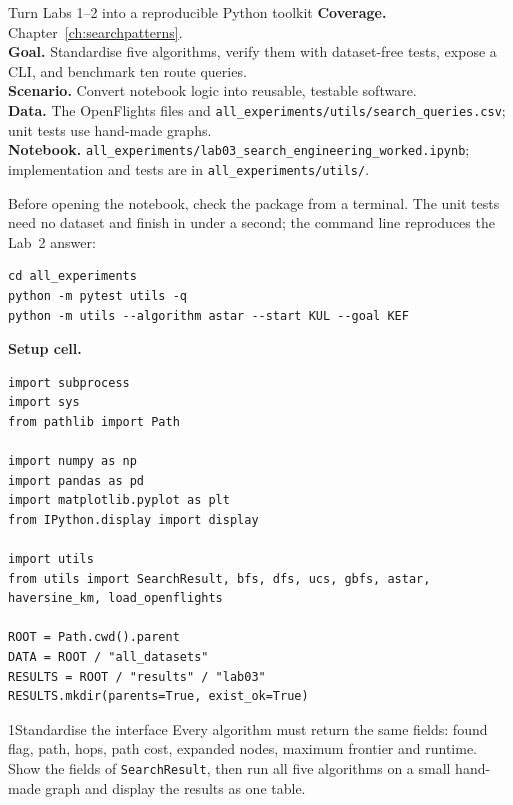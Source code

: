 
\begin{labproject}{Turn Labs 1--2 into a reproducible Python toolkit}
\textbf{Coverage.} Chapter~\ref{ch:searchpatterns}.\\
\textbf{Goal.} Standardise five algorithms, verify them with dataset-free tests, expose a CLI, and benchmark ten route queries.\\
\textbf{Scenario.} Convert notebook logic into reusable, testable software.\\
\textbf{Data.} The OpenFlights files and \texttt{all\_experiments/utils/search\_queries.csv}; unit tests use hand-made graphs.\\
\textbf{Notebook.} \texttt{all\_experiments/lab03\_search\_engineering\_worked.ipynb}; implementation and tests are in \texttt{all\_experiments/utils/}.
\end{labproject}

\begin{labmode}
Before opening the notebook, check the package from a terminal. The unit tests need no dataset and finish in under a second; the command line reproduces the Lab~2 answer:
\begin{lstlisting}[style=utpterminal]
cd all_experiments
python -m pytest utils -q
python -m utils --algorithm astar --start KUL --goal KEF
\end{lstlisting}
\end{labmode}

\noindent\textbf{Setup cell.}
\begin{lstlisting}[style=utppython]
import subprocess
import sys
from pathlib import Path

import numpy as np
import pandas as pd
import matplotlib.pyplot as plt
from IPython.display import display

import utils
from utils import SearchResult, bfs, dfs, ucs, gbfs, astar, haversine_km, load_openflights

ROOT = Path.cwd().parent
DATA = ROOT / "all_datasets"
RESULTS = ROOT / "results" / "lab03"
RESULTS.mkdir(parents=True, exist_ok=True)
\end{lstlisting}

\begin{labquestion}{1}{Standardise the interface}
Every algorithm must return the same fields: found flag, path, hops, path cost, expanded nodes, maximum frontier and runtime. Show the fields of \texttt{SearchResult}, then run all five algorithms on a small hand-made graph and display the results as one table.
\end{labquestion}

